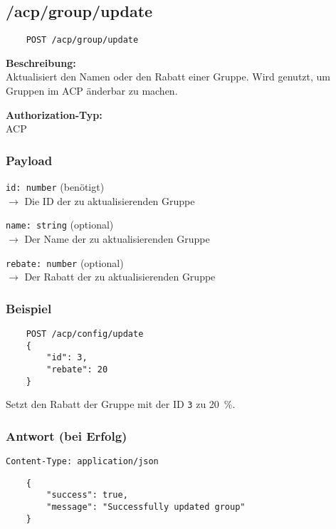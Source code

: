\subsection{/acp/group/update}

\begin{lstlisting}
    POST /acp/group/update
\end{lstlisting}

\textbf{Beschreibung:} \\
Aktualisiert den Namen oder den Rabatt einer Gruppe. Wird genutzt, um Gruppen im ACP änderbar zu machen.

\textbf{Authorization-Typ:} \\
ACP

\subsubsection{Payload}

\lstinline{id: number} (benötigt) \\
$\rightarrow$ Die ID der zu aktualisierenden Gruppe

\lstinline{name: string} (optional) \\
$\rightarrow$ Der Name der zu aktualisierenden Gruppe

\lstinline{rebate: number} (optional) \\
$\rightarrow$ Der Rabatt der zu aktualisierenden Gruppe

\subsubsection{Beispiel}

\begin{lstlisting}
    POST /acp/config/update
    {
        "id": 3,
        "rebate": 20
    }
\end{lstlisting}

Setzt den Rabatt der Gruppe mit der ID \lstinline{3} zu \SI{20}{\percent}.

\subsubsection{Antwort (bei Erfolg)}

\lstinline{Content-Type: application/json}
\begin{lstlisting}
    {
        "success": true, 
        "message": "Successfully updated group"
    }
\end{lstlisting}